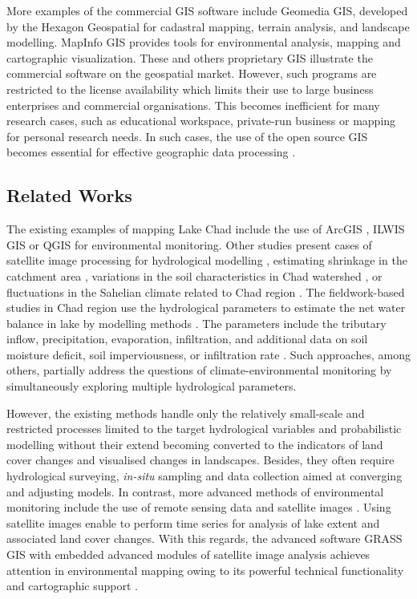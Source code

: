 \documentclass[geosciences,article,submit,pdftex,moreauthors]{Definitions/mdpi}
\begin{document}
More examples of the commercial GIS software include Geomedia GIS, developed by the Hexagon Geospatial for cadastral mapping, terrain analysis, and landscape modelling. MapInfo GIS provides tools for environmental analysis, mapping and cartographic visualization. These and others proprietary GIS illustrate the commercial software on the geospatial market. However, such programs are restricted to the license availability which limits their use to large business enterprises and commercial organisations. This becomes inefficient for many research cases, such as educational workspace, private-run business or mapping for personal research needs. In such cases, the use of the open source GIS becomes essential for effective geographic data processing \cite{Auda}. 

\subsection{Related Works}

The existing examples of mapping Lake Chad include the use of ArcGIS \cite{Nzango}, ILWIS GIS \cite{Onamuti} or QGIS \cite{PhamDuc} for environmental monitoring. Other studies present cases of satellite image processing for hydrological modelling \cite{rs14061511}, estimating shrinkage in the catchment area \cite{s18072082}, variations in the soil characteristics in Chad watershed \cite{rs10060924}, or fluctuations in the Sahelian climate related to Chad region \cite{su131910734}. The fieldwork-based studies in Chad region use the hydrological parameters to estimate the net water balance in lake by modelling methods \cite{MAHMOOD2019104043}. The parameters include the tributary inflow, precipitation, evaporation, infiltration, and additional data on soil moisture deficit, soil imperviousness, or infiltration rate \cite{MAHMOOD2019122}. Such approaches, among others, partially address the questions of climate-environmental monitoring by simultaneously exploring multiple hydrological parameters. 

However, the existing methods handle only the relatively small-scale and restricted processes limited to the target hydrological variables and probabilistic modelling \cite{Guganesharajah} without their extend becoming converted to the indicators of land cover changes and visualised changes in landscapes. Besides, they often require hydrological surveying, \emph{in-situ} sampling and data collection \cite{Robinson} aimed at converging and adjusting models. In contrast, more advanced methods of environmental monitoring include the use of remote sensing data \cite{CRETAUX20061098,LEBLANC201187} and satellite images \cite{rs11212534,Coe,info14040249}. Using satellite images enable to perform time series for analysis of lake extent and associated land cover changes. With this regards, the advanced software GRASS GIS with embedded advanced modules of satellite image analysis achieves attention in environmental mapping owing to its powerful technical functionality and cartographic support \cite{jmse11040871}. 
\end{document}

